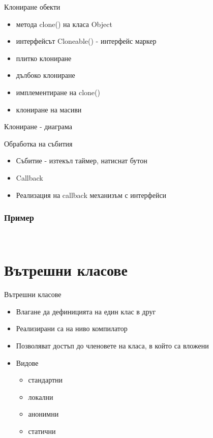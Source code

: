 \documentclass{beamer}
\begin{document}
\begin{frame}{Клониране обекти}
  \transdissolve
  \begin{itemize}
  \item метода clone() на класа Object
  \item интерфейсът Cloneable() - интерфейс маркер
  \item плитко клониране
  \item дълбоко клониране
  \item имплементиране на clone()
  \item клониране на масиви
  \end{itemize}
\end{frame}


\begin{frame}{Клониране - диаграма}
  \transdissolve
  
\end{frame}

\begin{frame}{Обработка на събития}
  \transdissolve
  \begin{itemize}
  \item Събитие - изтекъл таймер, натиснат бутон
  \item Callback
  \item Реализация на callback механизъм с интерфейси
  \end{itemize}
\end{frame}

\begin{frame}[fragile]
  \frametitle{Пример}
  \transdissolve
\begin{lstlisting}
  
\end{lstlisting}
\end{frame}

\section{Вътрешни класове}

\begin{frame}{Вътрешни класове}
  \transdissolve
  \begin{itemize}
  \item Влагане да дефиницията на един клас в друг
  \item Реализирани са на ниво компилатор
  \item Позволяват достъп до членовете на класа, в който са вложени
  \item Видове
    \begin{itemize}
      \item стандартни
      \item локални 
      \item анонимни
      \item статични
    \end{itemize}

  \end{itemize}
\end{frame}
\end{document}
